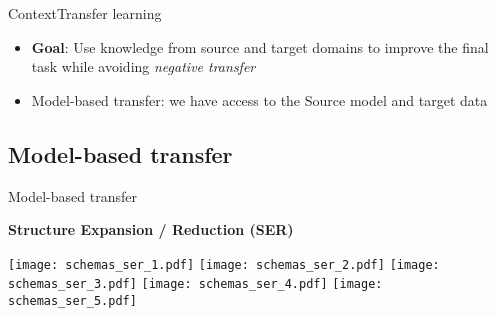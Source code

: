 \begin{frame}{Context}{Transfer learning}
\begin{itemize}
    \item \textbf{Goal}: Use knowledge from source and target domains to improve the final task while avoiding \textit{negative transfer}
    \item Model-based transfer: we have access to the Source model and target data
\end{itemize}


\end{frame}

\subsection{Model-based transfer}

\begin{frame}{Model-based transfer}

\centering\citet{segev2017learn}

\begin{minipage}[t]{0.49\linewidth}
    \vspace{0pt}
    \centering
    \textbf{Structure Expansion / Reduction (SER)}
    
    \renewcommand{\ratio}{0.55}
    \begin{overprint}
        \centering\texttt{[image: schemas\_ser\_1.pdf]}
        \centering\texttt{[image: schemas\_ser\_2.pdf]}
        \centering\texttt{[image: schemas\_ser\_3.pdf]}
        \centering\texttt{[image: schemas\_ser\_4.pdf]}
        \centering\texttt{[image: schemas\_ser\_5.pdf]}
    \end{overprint}
    

\end{minipage}
\end{frame}
